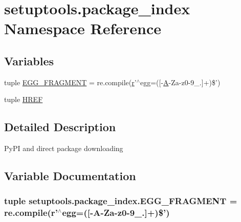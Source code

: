 \hypertarget{namespacesetuptools_1_1package__index}{}\section{setuptools.\+package\+\_\+index Namespace Reference}
\label{namespacesetuptools_1_1package__index}
\subsection*{Variables}
\begin{DoxyCompactItemize}
\item 
tuple \hyperlink{namespacesetuptools_1_1package__index_ae9fd86dcfb551a9677fc24bca75a6008}{E\+G\+G\+\_\+\+F\+R\+A\+G\+M\+E\+N\+T} = re.\+compile(\hyperlink{indexexpr_8h_ac434fd11cc2493608d8d91424d60c17e}{r}'$^\wedge$egg=(\mbox{[}-\/\hyperlink{classA}{A}-\/Za-\/z0-\/9\+\_\+.\mbox{]}+)\$')
\item 
tuple \hyperlink{namespacesetuptools_1_1package__index_a225aa76e4bbf555ddb21de9273d51867}{H\+R\+E\+F}
\end{DoxyCompactItemize}


\subsection{Detailed Description}
\begin{DoxyVerb}PyPI and direct package downloading\end{DoxyVerb}
 

\subsection{Variable Documentation}
\hypertarget{namespacesetuptools_1_1package__index_ae9fd86dcfb551a9677fc24bca75a6008}{}
\subsubsection[{E\+G\+G\+\_\+\+F\+R\+A\+G\+M\+E\+N\+T}]{\setlength{\rightskip}{0pt plus 5cm}tuple setuptools.\+package\+\_\+index.\+E\+G\+G\+\_\+\+F\+R\+A\+G\+M\+E\+N\+T = re.\+compile({\bf r}'$^\wedge$egg=(\mbox{[}-\/{\bf A}-\/Za-\/z0-\/9\+\_\+.\mbox{]}+)\$')}\label{namespacesetuptools_1_1package__index_ae9fd86dcfb551a9677fc24bca75a6008}
\hypertarget{namespacesetuptools_1_1package__index_a225aa76e4bbf555ddb21de9273d51867}{}
